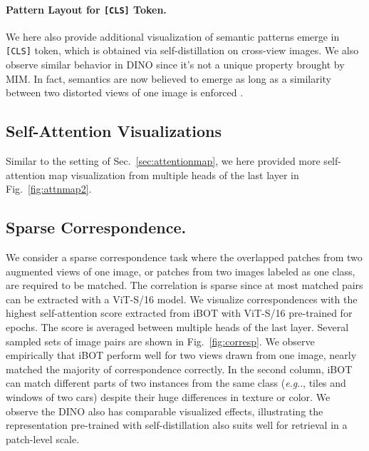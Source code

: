 \documentclass{article} \usepackage{iclr2022_conference,times}
\makeatletter
\def\ourmethod{{iBOT}\xspace}
\DeclareRobustCommand\onedot{\futurelet\@let@token\@onedot}
\def\@onedot{\ifx\@let@token.\else.\null\fi\xspace}
\def\eg{\emph{e.g}\onedot} \def\Eg{\emph{E.g}\onedot}
\makeatother
\begin{document}
\paragraph{Pattern Layout for \texttt{[CLS]} Token.} We here also provide additional visualization of semantic patterns emerge in \texttt{[CLS]} token, which is obtained via self-distillation on cross-view images. We also observe similar behavior in DINO since it's not a unique property brought by MIM. In fact, semantics are now believed to emerge as long as a similarity between two distorted views of one image is enforced \citep{byol,moco,swav,deepcluster}.

\subsection{Self-Attention Visualizations}
\label{sec:attentionmap2}

Similar to the setting of Sec.~\ref{sec:attentionmap}, we here provided more self-attention map visualization from multiple heads of the last layer in Fig.~\ref{fig:attnmap2}. 



\subsection{Sparse Correspondence.} 
We consider a sparse correspondence task where the overlapped patches from two augmented views of one image, or patches from two images labeled as one class, are required to be matched. 
The correlation is sparse since at most  matched pairs can be extracted with a ViT-S/16 model. 
We visualize  correspondences with the highest self-attention score extracted from \ourmethod with ViT-S/16 pre-trained for  epochs. The score is averaged between multiple heads of the last layer. 
Several sampled sets of image pairs are shown in Fig.~\ref{fig:corresp}. 
We observe empirically that \ourmethod perform well for two views drawn from one image, nearly matched the majority of correspondence correctly. 
In the second column, \ourmethod can match different parts of two instances from the same class (\eg, tiles and windows of two cars) despite their huge differences in texture or color. 
We observe the DINO also has comparable visualized effects, illustrating the representation pre-trained with self-distillation also suits well for retrieval in a patch-level scale.


\newpage
\end{document}
